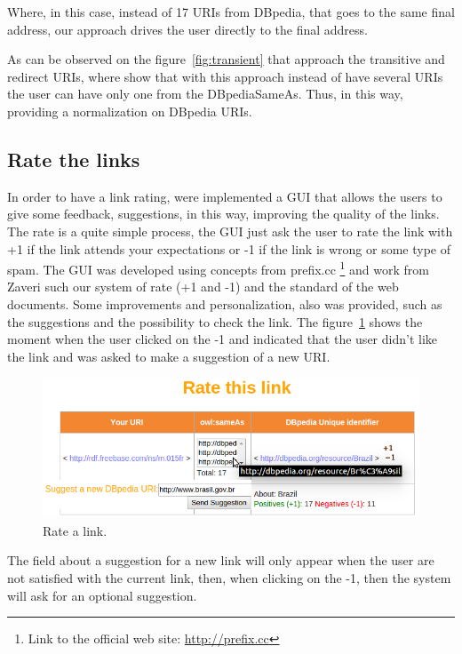 Where, in this case, instead of 17 URIs from DBpedia, that goes to the same final address, our approach drives the user directly to the final address.

As can be observed on the figure~\ref{fig:transient} that approach the transitive and redirect URIs, where show that with this approach instead of have several URIs the user can have only one from the DBpediaSameAs. Thus, in this way, providing a normalization on DBpedia URIs.

\subsection{Rate the links}

In order to have a link rating, were implemented a GUI that allows the users to give some feedback, suggestions, in this way, improving the quality of the links.
The rate is a quite simple process, the GUI just ask the user to rate the link with +1 if the link attends your expectations or -1 if the link is wrong or some type of spam.
The GUI was developed using concepts from prefix.cc \footnote{Link to the official web site: \url{http://prefix.cc}} and work from Zaveri\cite{anra2013} such our system of rate (+1 and -1) and the standard of the web documents. Some improvements and personalization, also was provided, such as the suggestions and the possibility to check the link. The figure~\ref{fig:rate} shows the moment when the user clicked on the -1 and  indicated that the user didn't like the link and was asked to make a suggestion of a new URI.

\begin{figure}[hbt] 
  	\centering
	\includegraphics[width=\columnwidth]{img/rate2.png}
  	\caption{Rate a link.}
  	\label{fig:rate}
\end{figure}

The field about a suggestion for a new link will only appear when the user are not satisfied with the current link, then, when clicking on the -1, then the system will ask for an optional suggestion.

